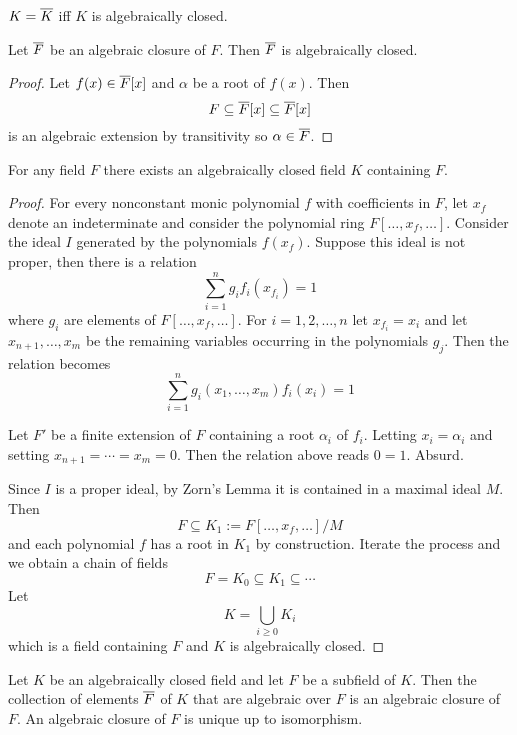 \documentclass[a4paper]{article}
\begin{document}
$K=\overline{K}$ iff $K$ is algebraically closed.

\begin{proposition}
  Let $\overline{F}$ be an algebraic closure of $F$. Then $\overline{F}$ is algebraically closed.
\end{proposition}

\begin{proof}
  Let $f(x)\in\overline{F}[x]$ and $\alpha$ be a root of $f(x)$. Then
  \[ F \subseteq \overline{F}[x] \subseteq \overline{F}[x] \]
  is an algebraic extension by transitivity so $\alpha\in\overline{F}$.
\end{proof}

\begin{proposition}
  For any field $F$ there exists an algebraically closed field $K$ containing $F$.
\end{proposition}

\begin{proof}
  For every nonconstant monic polynomial $f$ with coefficients in $F$, let $x_f$ denote an indeterminate and consider the polynomial ring $F[\ldots,x_f,\ldots]$. Consider the ideal $I$ generated by the polynomials $f(x_f)$. Suppose this ideal is not proper, then there is a relation
  \[ \sum_{i=1}^n g_i f_i(x_{f_i}) = 1 \]
  where $g_i$ are elements of $F[\ldots,x_f,\ldots]$. For $i=1,2,\ldots,n$ let $x_{f_i}=x_i$ and let $x_{n+1},\ldots,x_m$ be the remaining variables occurring in the polynomials $g_j$. Then the relation becomes
  \[ \sum_{i=1}^n g_i(x_1,\ldots,x_m) f_i(x_i) = 1 \]

  Let $F'$ be a finite extension of $F$ containing a root $\alpha_i$ of $f_i$. Letting $x_i = \alpha_i$ and setting $x_{n+1}=\cdots=x_m=0$. Then the relation above reads $0=1$. Absurd.

  Since $I$ is a proper ideal, by Zorn's Lemma it is contained in a maximal ideal $M$. Then
  \[ F \subseteq K_1:= F[\ldots,x_f,\ldots]/M \]
  and each polynomial $f$ has a root in $K_1$ by construction. Iterate the process and we obtain a chain of fields
  \[ F= K_0 \subseteq K_1 \subseteq \cdots \]
  Let
  \[ K = \bigcup_{i\geq0} K_i \]
  which is a field containing $F$ and $K$ is algebraically closed.
\end{proof}

\begin{proposition}
  Let $K$ be an algebraically closed field and let $F$ be a subfield of $K$. Then the collection of elements $\overline{F}$ of $K$ that are algebraic over $F$ is an algebraic closure of $F$. An algebraic closure of $F$ is unique up to isomorphism.
\end{proposition}
\end{document}
